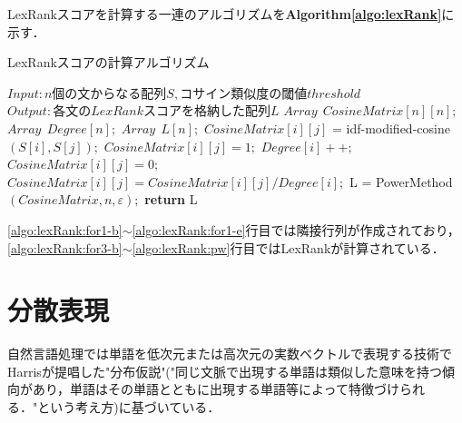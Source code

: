 LexRankスコアを計算する一連のアルゴリズムを\textbf{Algorithm\ref{algo:lexRank}}に示す．
\begin{algorithm}
\caption{LexRankスコアの計算アルゴリズム} \label{algo:lexRank}
\begin{algorithmic}[1]
\State $Input: n 個の文からなる配列 S, コサイン類似度の閾値 threshold$
\State $Output: 各文のLexRankスコアを格納した配列L$
\State $Array ~~ CosineMatrix[n][n];$
\State $Array ~~ Degree[n];$
\State $Array ~~ L[n];$
	 \label{algo:lexRank:for1-b}
	 	\label{algo:lexRank:for2-b}
			\State $CosineMatrix[i][j]$ = idf-modified-cosine$(S[i], S[j]);$\label{algo:lexRank:cos}
				\State $CosineMatrix[i][j] = 1;$
				\State $Degree[i]++;$
			\Else
			 	\State $CosineMatrix[i][j] = 0;$
			\EndIf
		\EndFor\label{algo:lexRank:for2-e}
	 \EndFor\label{algo:lexRank:for1-e}
        \label{algo:lexRank:for3-b}
    		\label{algo:lexRank:for4-b}
         		\State $CosineMatrix[i][j] = CosineMatrix[i][j] / Degree[i];$
    		\EndFor\label{for4}\label{algo:lexRank:for4-e}
	\EndFor\label{for3}\label{algo:lexRank:for3-e}
	\State L = PowerMethod$(CosineMatrix, n, ε);$\label{algo:lexRank:pw}
	\State \textbf{return} L
\EndProcedure
\end{algorithmic}
\end{algorithm}

\ref{algo:lexRank:for1-b}$\sim$\ref{algo:lexRank:for1-e}行目では隣接行列が作成されており，\ref{algo:lexRank:for3-b}$\sim$\ref{algo:lexRank:pw}行目ではLexRankが計算されている．
\section{分散表現}
\label{rel:part:vec}
自然言語処理では単語を低次元または高次元の実数ベクトルで表現する技術でHarris\cite{firth1957hypothesis}が提唱した"分布仮説"("同じ文脈で出現する単語は類似した意味を持つ傾向があり，単語はその単語とともに出現する単語等によって特徴づけられる．"という考え方)に基づいている．
